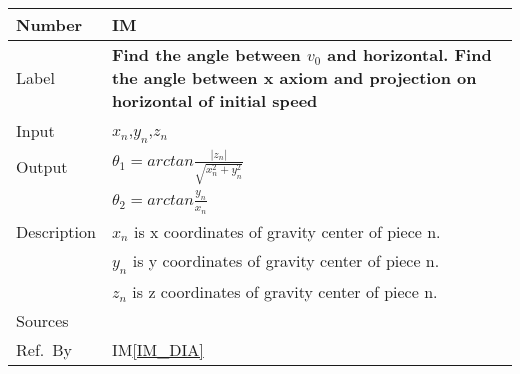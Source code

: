 \documentclass[12pt]{article}
\newcommand{\colAwidth}{0.13\textwidth}
\newcommand{\colBwidth}{0.82\textwidth}
\newcounter{instnum} %
\newcommand{\iref}[1]{IM\ref{#1}}
\begin{document}
~\newline


\noindent
\begin{minipage}{\textwidth}
	\renewcommand*{\arraystretch}{1.5}
	\begin{tabular}{| p{\colAwidth} | p{\colBwidth}|}
		\hline
		\rowcolor[gray]{0.9}
		Number& IM{instnum}\theinstnum \label{IM_angle}\\
		\hline
		Label& \bf Find the angle between $v_{0}$ and horizontal. Find the angle between x axiom and projection on horizontal of initial speed \\
		\hline
		Input&$x_{n}$,$y_{n}$,$z_{n}$\\
		\hline
		Output&$\theta_{1}=arctan \frac{|z_{n}|}{\sqrt{x_{n}^2+y_{n}^2}}$\\
		&$\theta_{2}=arctan \frac{y_{n}}{x_{n}}$\\
		\hline
		Description&$x_{n}$ is x coordinates of gravity center of piece n.\\
		&$y_{n}$ is y coordinates of gravity center of piece n.\\
		&$z_{n}$ is z coordinates of gravity center of piece n.\\
		\hline
		Sources&~\ \ \\
		\hline
		Ref.\ By & \iref{IM_DIA}\\
		\hline
	\end{tabular}
\end{minipage}\\

~\newline
\end{document}
